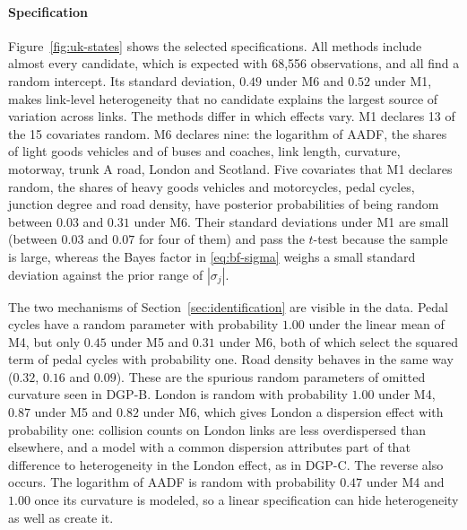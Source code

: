 \paragraph{Specification} Figure~\ref{fig:uk-states} shows the selected specifications. All methods include almost every candidate, which is expected with 68{,}556 observations, and all find a random intercept. Its standard deviation, $0.49$ under M6 and $0.52$ under M1, makes link-level heterogeneity that no candidate explains the largest source of variation across links. The methods differ in which effects vary. M1 declares 13 of the 15 covariates random. M6 declares nine: the logarithm of AADF, the shares of light goods vehicles and of buses and coaches, link length, curvature, motorway, trunk A road, London and Scotland. Five covariates that M1 declares random, the shares of heavy goods vehicles and motorcycles, pedal cycles, junction degree and road density, have posterior probabilities of being random between $0.03$ and $0.31$ under M6. Their standard deviations under M1 are small (between $0.03$ and $0.07$ for four of them) and pass the $t$-test because the sample is large, whereas the Bayes factor in \eqref{eq:bf-sigma} weighs a small standard deviation against the prior range of $|\sigma_j|$.

The two mechanisms of Section~\ref{sec:identification} are visible in the data. Pedal cycles have a random parameter with probability $1.00$ under the linear mean of M4, but only $0.45$ under M5 and $0.31$ under M6, both of which select the squared term of pedal cycles with probability one. Road density behaves in the same way ($0.32$, $0.16$ and $0.09$). These are the spurious random parameters of omitted curvature seen in DGP-B. London is random with probability $1.00$ under M4, $0.87$ under M5 and $0.82$ under M6, which gives London a dispersion effect with probability one: collision counts on London links are less overdispersed than elsewhere, and a model with a common dispersion attributes part of that difference to heterogeneity in the London effect, as in DGP-C. The reverse also occurs. The logarithm of AADF is random with probability $0.47$ under M4 and $1.00$ once its curvature is modeled, so a linear specification can hide heterogeneity as well as create it.

